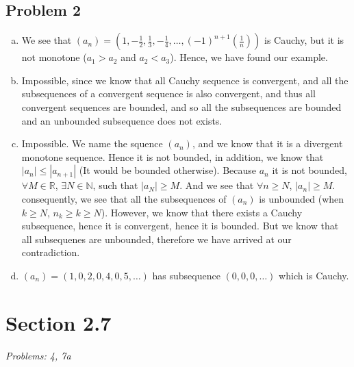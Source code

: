 \documentclass[12pt]{article}
\begin{document}
\subsection*{Problem 2}
\begin{enumerate}[a).]
    \item {
        We see that $(a_n) = (1, -\frac{1}{2}, \frac{1}{3}, -\frac{1}{4}, \dots, (-1)^{n+1}(\frac{1}{n}))$ is Cauchy, but it is not monotone ($a_1 > a_2$ and $a_2 < a_3$). 
        Hence, we have found our example.
    }
    \item {
        Impossible, since we know that all Cauchy sequence is convergent, and all the subsequences of a convergent sequence is also convergent, and thus all convergent sequences are bounded, and so all the subsequences are bounded and an unbounded subsequence does not exists. 
    }
    \item {
        Impossible.
        We name the squence $(a_n)$, and we know that it is a divergent monotone sequence. 
        Hence it is not bounded, in addition, we know that $|a_n| \le |a_{n+1}|$ (It would be bounded otherwise). 
        Because $a_n$ it is not bounded, $\forall M \in \mathbb{R}$, $\exists N \in \mathbb{N}$, such that $|a_N| \ge M$. 
        And we see that $\forall n \ge N$, $|a_{n}| \ge M$. 
        consequently, we see that all the subsequences of $(a_n)$ is unbounded (when $k \ge N$, $n_k \ge k \ge N$). 
        However, we know that there exists a Cauchy subsequence, hence it is convergent, hence it is bounded. 
        But we know that all subsequenes are unbounded, therefore we have arrived at our contradiction.
    }
    \item {
        $(a_n) = (1, 0, 2, 0, 4, 0, 5, \dots )$ has subsequence $(0,0,0, \dots)$ which is Cauchy. 
    }
\end{enumerate}


\vspace*{1cm}


\section*{Section 2.7}
\textit{Problems: 4, 7a}
\end{document}
